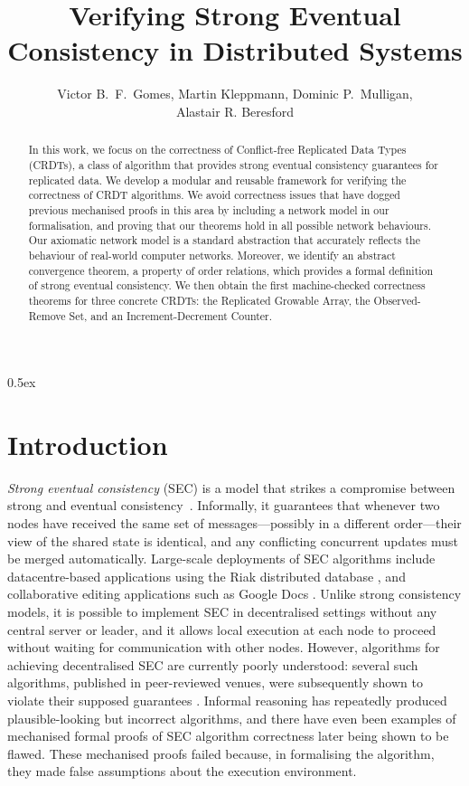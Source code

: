 \documentclass[11pt,a4paper]{article}
\begin{document}
\title{Verifying Strong Eventual Consistency in Distributed Systems}
\author{Victor B.~F.~Gomes, Martin Kleppmann, Dominic P.~Mulligan,\\Alastair R. Beresford}
\maketitle

\begin{abstract}
In this work, we focus on the correctness of Conflict-free Replicated Data Types (CRDTs), a class of algorithm that provides strong eventual consistency guarantees for replicated data.
We develop a modular and reusable framework for verifying the correctness of CRDT algorithms.
We avoid correctness issues that have dogged previous mechanised proofs in this area by including a network model in our formalisation, and proving that our theorems hold in all possible network behaviours.
Our axiomatic network model is a standard abstraction that accurately reflects the behaviour of real-world computer networks.
Moreover, we identify an abstract convergence theorem, a property of order relations, which provides a formal definition of strong eventual consistency.
We then obtain the first machine-checked correctness theorems for three concrete CRDTs: the Replicated Growable Array, the Observed-Remove Set, and an Increment-Decrement Counter.
\end{abstract}

\tableofcontents

\parindent 0pt\parskip 0.5ex

\section {Introduction}

\emph{Strong eventual consistency} (SEC) is a model that strikes a compromise between strong and eventual consistency~\cite{Shapiro:2011un}.
Informally, it guarantees that whenever two nodes have received the same set of messages---possibly in a different order---their view of the shared state is identical, and any conflicting concurrent updates must be merged automatically.
Large-scale deployments of SEC algorithms include datacentre-based applications using the Riak distributed database \cite{Brown:2014hs}, and collaborative editing applications such as Google Docs \cite{DayRichter:2010tt}.
Unlike strong consistency models, it is possible to implement SEC in decentralised settings without any central server or leader, and it allows local execution at each node to proceed without waiting for communication with other nodes.
However, algorithms for achieving decentralised SEC are currently poorly understood: several such algorithms, published in peer-reviewed venues, were subsequently shown to violate their supposed guarantees \cite{Imine:2003ks,Imine:2006kn,Oster:2005vi}.
Informal reasoning has repeatedly produced plausible-looking but incorrect algorithms, and there have even been examples of mechanised formal proofs of SEC algorithm correctness later being shown to be flawed.
These mechanised proofs failed because, in formalising the algorithm, they made false assumptions about the execution environment.
\end{document}
